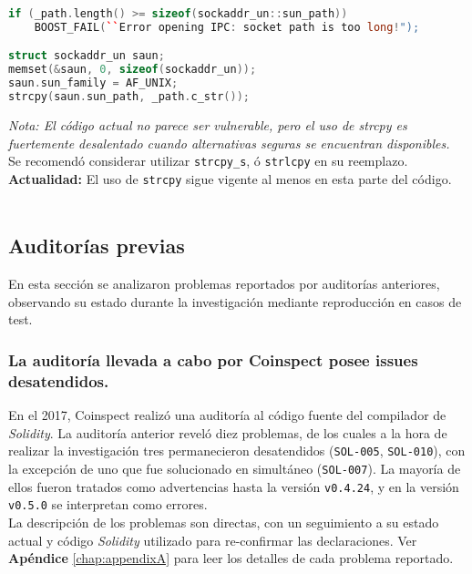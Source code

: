 \begin{lstlisting}[language=c++, caption={\texttt{test/RPCSession.cpp:63}}]
if (_path.length() >= sizeof(sockaddr_un::sun_path))
    BOOST_FAIL(``Error opening IPC: socket path is too long!");

struct sockaddr_un saun;
memset(&saun, 0, sizeof(sockaddr_un));
saun.sun_family = AF_UNIX;
strcpy(saun.sun_path, _path.c_str());
\end{lstlisting}

\textit{Nota: El código actual no parece ser vulnerable, pero el uso de strcpy es fuertemente desalentado cuando alternativas seguras se encuentran disponibles.}\\

Se recomendó considerar utilizar \texttt{strcpy\_s}, ó \texttt{strlcpy} en su reemplazo.\\

\textbf{Actualidad:} El uso de \texttt{strcpy} sigue vigente al menos en esta parte del código.\\\\

\subsection{Auditorías previas}
En esta sección se analizaron problemas reportados por auditorías anteriores, observando su estado durante la investigación mediante reproducción en casos de test.

\subsubsection{La auditoría llevada a cabo por Coinspect posee issues desatendidos.}

En el 2017, Coinspect realizó una auditoría\cite{SolidityCompilerAuditReport} al código fuente del compilador de \textit{Solidity}. La auditoría anterior reveló diez problemas, de los cuales a la hora de realizar la investigación tres permanecieron desatendidos (\texttt{SOL-005}, \texttt{SOL-010}), con la excepción de uno que fue solucionado en simultáneo (\texttt{SOL-007}). La mayoría de ellos fueron tratados como advertencias hasta la versión \texttt{v0.4.24}, y en la versión \texttt{v0.5.0} se interpretan como errores.\\

La descripción de los problemas son directas, con un seguimiento a su estado actual y código \textit{Solidity} utilizado para re-confirmar las declaraciones. Ver \textbf{Apéndice} \ref{chap:appendixA} para leer los detalles de cada problema reportado.\\

